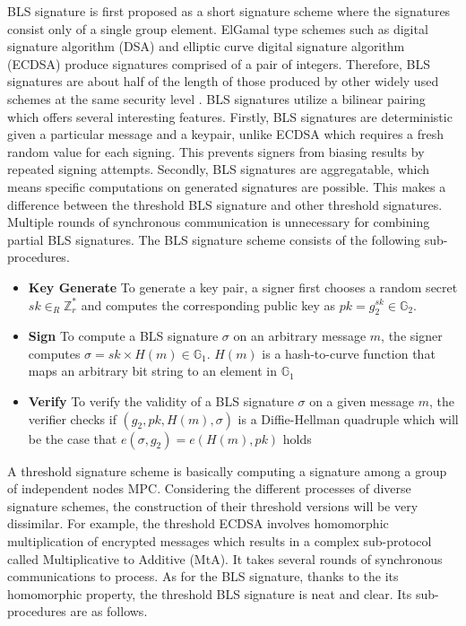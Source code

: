 \documentclass[11pt]{article}
\begin{document}
BLS signature is first proposed as a short signature scheme where the signatures consist only of a single group element. ElGamal type schemes such as digital signature algorithm (DSA) and elliptic curve digital signature algorithm (ECDSA) produce signatures comprised of a pair of integers. Therefore, BLS signatures are about half of the length of those produced by other widely used schemes at the same security level \cite{menezes2009introduction}. BLS signatures utilize a bilinear pairing which offers several interesting features. Firstly, BLS signatures are deterministic given a particular message and a keypair, unlike ECDSA which requires a fresh random value for each signing. This prevents signers from biasing results by repeated signing attempts. Secondly, BLS signatures are aggregatable, which means specific computations on generated signatures are possible. This makes a difference between the threshold BLS signature and other threshold signatures. Multiple rounds of synchronous communication is unnecessary for combining partial BLS signatures. The BLS signature scheme consists of the following sub-procedures.
\begin{itemize}
    \item[] \textbf{Key Generate} To generate a key pair, a signer first chooses a random secret $sk \in_R \mathbb{Z}_r^*$ and computes the corresponding public key as $pk = g_2^{sk} \in \mathbb{G}_2$.
    \item[] \textbf{Sign} To compute a BLS signature $\sigma$ on an arbitrary message $m$, the signer computes $\sigma = sk \times H(m) \in \mathbb{G}_1$. $H(m)$ is a hash-to-curve function that maps an arbitrary bit string to an element in $\mathbb{G}_1$
    \item[] \textbf{Verify} To verify the validity of a BLS signature $\sigma$ on a given message $m$, the verifier checks if $(g_2,pk,H(m),\sigma)$ is a Diffie-Hellman quadruple which will be the case that $e(\sigma,g_2)=e(H(m),pk)$ holds
\end{itemize}

A threshold signature scheme is basically computing a signature among a group of independent nodes MPC. Considering the different processes of diverse signature schemes, the construction of their threshold versions will be very dissimilar. For example, the threshold ECDSA involves homomorphic multiplication of encrypted messages which results in a complex sub-protocol called Multiplicative to Additive (MtA). It takes several rounds of synchronous communications to process. As for the BLS signature, thanks to the its homomorphic property, the threshold BLS signature is neat and clear. Its sub-procedures are as follows.
\end{document}
